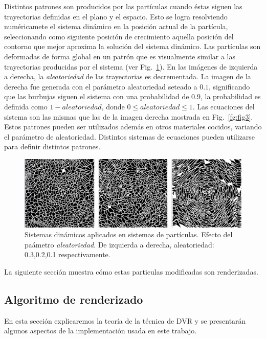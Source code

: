 \documentclass[oneside,a4paper,spanish,links]{amca}
\begin{document}
Distintos patrones son producidos por las part\'iculas cuando \'estas siguen las trayectorias definidas en el plano y el espacio. Esto se logra resolviendo num\'ericamete el sistema din\'amico en la posici\'on actual de la part\'icula, seleccionando como siguiente posici\'on de crecimiento aquella posici\'on del contorno que mejor aproxima la soluci\'on del sistema din\'amico. Las part\'iculas son deformadas de forma global en un patr\'on que es visualmente similar a las trayectorias producidas por el sistema (ver Fig.~\ref{fg:fig4}). En las im\'agenes de izquierda a derecha, la {\em aleatoriedad} de las trayectorias es decrementada. La imagen de la derecha fue generada con el par\'ametro aleatoriedad seteado a $0.1$, significando que las burbujas siguen el sistema con una probabilidad de $0.9$, la probabilidad es definida como $1-aleatoriedad$, donde $0 \leq aleatoriedad \leq 1$. Las ecuaciones del sistema son las mismas que las de la imagen derecha mostrada en Fig.~\ref{fg:fig3}. Estos patrones pueden ser utilizados adem\'as en otros materiales cocidos, variando el par\'ametro de aleatoriedad. Distintos sistemas de ecuaciones pueden utilizarse para definir distintos patrones.

\begin{figure}[htb!]
  \centerline{\includegraphics[scale=0.21]{fig4}}
  \caption{Sistemas din\'amicos aplicados en sistemas de part\'iculas. Efecto del pa\'ametro {\em aleatoriedad}. De izquierda a derecha, aleatoriedad: 0.3,0.2,0.1 respectivamente. }
  \label{fg:fig4}
\end{figure}

La siguiente secci\'on muestra c\'omo estas particulas modificadas son renderizadas.

\subsection{Algoritmo de renderizado}

En esta sección explicaremos la teoría de la técnica de DVR y se
presentarán algunos aspectos de la implementación usada en este
trabajo.
\end{document}
